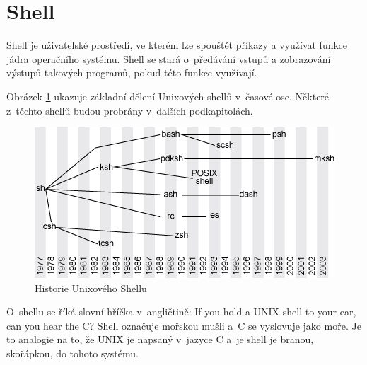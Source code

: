 \documentclass[thesis=M,czech]{FITthesis}[2012/06/26]
\begin{document}




\section{Shell}

Shell je uživatelské prostředí, ve kterém lze spouštět příkazy a využívat funkce jádra operačního systému. Shell se stará o~předávání vstupů a zobrazování výstupů takových programů, pokud této funkce využívají.

Obrázek \ref{fig:shell_history} ukazuje základní dělení Unixových shellů v~časové ose. Některé z~těchto shellů budou probrány v~dalších podkapitolách.

\begin{figure}[htb]\centering
	\includegraphics[width=\textwidth]{./images/tmp_shell_history}
	\caption{Historie Unixového Shellu \cite{historyofshells}}
	\label{fig:shell_history}
\end{figure}

O~shellu se říká slovní hříčka v~angličtině: If you hold a UNIX shell to your ear, can you hear the C? Shell označuje mořskou mušli a~C se vyslovuje jako moře. Je to analogie na to, že UNIX je napsaný v~jazyce C a~je shell je branou, skořápkou, do tohoto systému.


\end{document}

